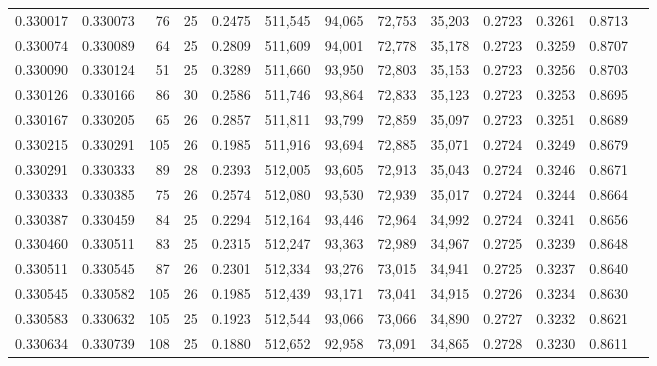 \begin{tabular}{rrrrrrrrrrrrr}
0.330017 & 0.330073 &    76 &  25 &                                     0.2475 & 511,545 &  94,065 &  72,753 &  35,203 & 0.2723 & 0.3261 & 0.8713 \\
0.330074 & 0.330089 &    64 &  25 &                                     0.2809 & 511,609 &  94,001 &  72,778 &  35,178 & 0.2723 & 0.3259 & 0.8707 \\
0.330090 & 0.330124 &    51 &  25 &                                     0.3289 & 511,660 &  93,950 &  72,803 &  35,153 & 0.2723 & 0.3256 & 0.8703 \\
0.330126 & 0.330166 &    86 &  30 &                                     0.2586 & 511,746 &  93,864 &  72,833 &  35,123 & 0.2723 & 0.3253 & 0.8695 \\
0.330167 & 0.330205 &    65 &  26 &                                     0.2857 & 511,811 &  93,799 &  72,859 &  35,097 & 0.2723 & 0.3251 & 0.8689 \\
0.330215 & 0.330291 &   105 &  26 &                                     0.1985 & 511,916 &  93,694 &  72,885 &  35,071 & 0.2724 & 0.3249 & 0.8679 \\
0.330291 & 0.330333 &    89 &  28 &                                     0.2393 & 512,005 &  93,605 &  72,913 &  35,043 & 0.2724 & 0.3246 & 0.8671 \\
0.330333 & 0.330385 &    75 &  26 &                                     0.2574 & 512,080 &  93,530 &  72,939 &  35,017 & 0.2724 & 0.3244 & 0.8664 \\
0.330387 & 0.330459 &    84 &  25 &                                     0.2294 & 512,164 &  93,446 &  72,964 &  34,992 & 0.2724 & 0.3241 & 0.8656 \\
0.330460 & 0.330511 &    83 &  25 &                                     0.2315 & 512,247 &  93,363 &  72,989 &  34,967 & 0.2725 & 0.3239 & 0.8648 \\
0.330511 & 0.330545 &    87 &  26 &                                     0.2301 & 512,334 &  93,276 &  73,015 &  34,941 & 0.2725 & 0.3237 & 0.8640 \\
0.330545 & 0.330582 &   105 &  26 &                                     0.1985 & 512,439 &  93,171 &  73,041 &  34,915 & 0.2726 & 0.3234 & 0.8630 \\
0.330583 & 0.330632 &   105 &  25 &                                     0.1923 & 512,544 &  93,066 &  73,066 &  34,890 & 0.2727 & 0.3232 & 0.8621 \\
0.330634 & 0.330739 &   108 &  25 &                                     0.1880 & 512,652 &  92,958 &  73,091 &  34,865 & 0.2728 & 0.3230 & 0.8611 \\

\end{tabular}
